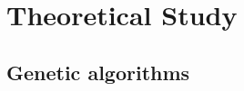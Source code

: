 \part{Theoretical Study}\label{part:theoretical_study}
    \chapter{Genetic algorithms}\label{chapter:ga}
        

%         
%         
    
%         



